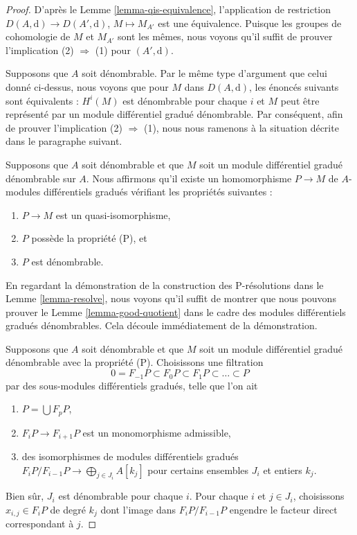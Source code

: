 \begin{proof}
\medskip\noindent
D'après le Lemme \ref{lemma-qis-equivalence}, l'application de restriction $D(A,
\text{d}) \to D(A', \text{d})$, $M \mapsto M_{A'}$ est une équivalence. Puisque
les groupes de cohomologie de $M$ et $M_{A'}$ sont les mêmes, nous voyons qu'il
suffit de prouver l'implication (2) $\Rightarrow$ (1) pour $(A', \text{d})$.

\medskip\noindent
Supposons que $A$ soit dénombrable. Par le même type d'argument que celui donné
ci-dessus, nous voyons que pour $M$ dans $D(A, \text{d})$, les énoncés suivants
sont équivalents : $H^i(M)$ est dénombrable pour chaque $i$ et $M$ peut être
représenté par un module différentiel gradué dénombrable. Par conséquent, afin de
prouver l'implication (2) $\Rightarrow$ (1), nous nous ramenons à la situation
décrite dans le paragraphe suivant.

\medskip\noindent
Supposons que $A$ soit dénombrable et que $M$ soit un module différentiel gradué
dénombrable sur $A$. Nous affirmons qu'il existe un homomorphisme $P \to M$ de
$A$-modules différentiels gradués vérifiant les propriétés suivantes :
\begin{enumerate}
\item $P \to M$ est un quasi-isomorphisme,
\item $P$ possède la propriété (P), et
\item $P$ est dénombrable.
\end{enumerate}
En regardant la démonstration de la construction des P-résolutions dans le Lemme
\ref{lemma-resolve}, nous voyons qu'il suffit de montrer que nous pouvons prouver
le Lemme \ref{lemma-good-quotient} dans le cadre des modules différentiels gradués
dénombrables. Cela découle immédiatement de la démonstration.

\medskip\noindent
Supposons que $A$ soit dénombrable et que $M$ soit un module différentiel gradué
dénombrable avec la propriété (P). Choisissons une filtration
$$
0 = F_{-1}P \subset F_0P \subset F_1P \subset \ldots \subset P
$$
par des sous-modules différentiels gradués, telle que l'on ait
\begin{enumerate}
\item $P = \bigcup F_pP$,
\item $F_iP \to F_{i + 1}P$ est un monomorphisme admissible,
\item des isomorphismes de modules différentiels gradués $F_iP/F_{i - 1}P \to
\bigoplus_{j \in J_i} A[k_j]$ pour certains ensembles $J_i$ et entiers $k_j$.
\end{enumerate}
Bien sûr, $J_i$ est dénombrable pour chaque $i$. Pour chaque $i$ et $j \in J_i$,
choisissons $x_{i, j} \in F_iP$ de degré $k_j$ dont l'image dans $F_iP/F_{i - 1}P$
engendre le facteur direct correspondant à $j$.


\end{proof}
